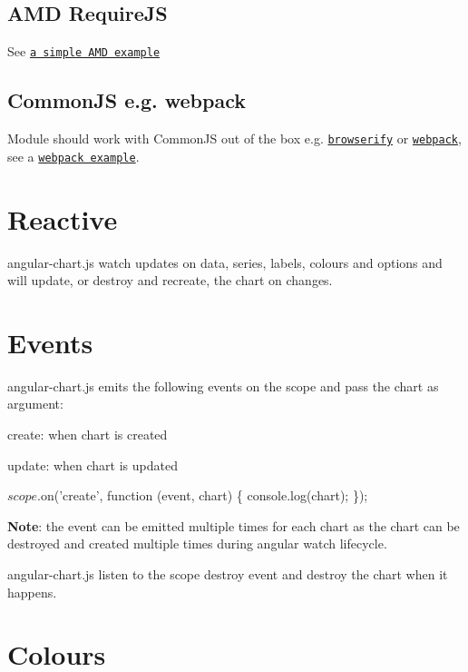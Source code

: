 \subsection*{A\+MD Require\+JS}

See \href{examples/amd.js}{\tt a simple A\+MD example}

\subsection*{Common\+JS e.\+g. webpack}

Module should work with Common\+JS out of the box e.\+g. \href{http://browserify.org/}{\tt browserify} or \href{http://webpack.github.io/}{\tt webpack}, see a \href{examples/webpack.config.js}{\tt webpack example}.

\section*{Reactive}

angular-\/chart.\+js watch updates on data, series, labels, colours and options and will update, or destroy and recreate, the chart on changes.

\section*{Events}

angular-\/chart.\+js emits the following events on the {\ttfamily scope} and pass the chart as argument\+:


\begin{DoxyItemize}
\item {\ttfamily create}\+: when chart is created
\item {\ttfamily update}\+: when chart is updated
\end{DoxyItemize}


\begin{DoxyCode}
$scope.$on('create', function (event, chart) \{
  console.log(chart);
\});
\end{DoxyCode}


{\bfseries Note}\+: the event can be emitted multiple times for each chart as the chart can be destroyed and created multiple times during angular {\ttfamily watch} lifecycle.

angular-\/chart.\+js listen to the scope {\ttfamily destroy} event and destroy the chart when it happens.

\section*{Colours}

